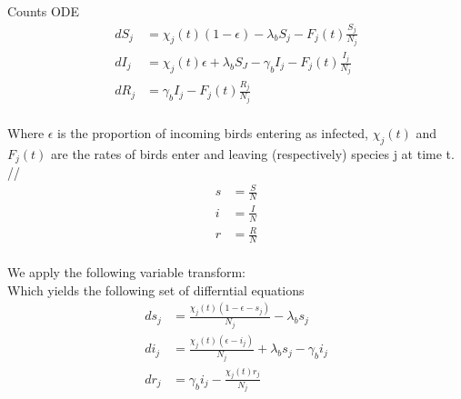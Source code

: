 \documentclass[12pt]{article}
\begin{document}
Counts ODE		\\
\begin{align*} 
dS_j &= \chi_j(t)(1-\epsilon) - \lambda_bS_j - F_j(t)\frac{S_j}{N_j}		\\
dI_j &= \chi_j(t)\epsilon +\lambda_bS_J - \gamma_bI_j - F_j(t)\frac{I_j}{N_j}		\\
dR_j &= \gamma_bI_j - F_j(t)\frac{R_j}{N_j}		\\
\end{align*} 

Where $\epsilon$ is the proportion of incoming birds entering as infected, $\chi_j(t)$ and $F_j(t)$  are the rates of birds enter and leaving (respectively) species j at time t. //
\begin{align*}
s &= \frac{S}{N} \\
i &= \frac{I}{N} \\
r &= \frac{R}{N} \\
\end{align*} 

We apply the following variable transform: \\


Which yields the following set of differntial equations \\
\begin{align*}
ds_j &= \frac{\chi_j(t)(1-\epsilon - s_j)}{N_j} - \lambda_bs_j                   \\	
di_j &= \frac{\chi_j(t)(\epsilon-i_j)}{N_j} +\lambda_bs_j - \gamma_bi_j   \\
dr_j &= \gamma_bi_j - \frac{\chi_j(t)r_j}{N_j}		\\
\end{align*} 
\end{document}
